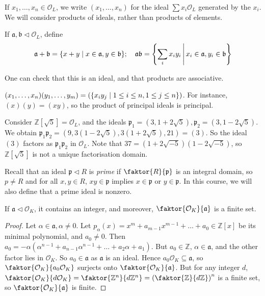 If \( x_1, \dots, x_n \in \mathcal O_L \), we write \( (x_1, \dots, x_n) \) for the ideal \( \sum x_i \mathcal O_L \) generated by the \( x_i \).
We will consider products of ideals, rather than products of elements.
\begin{definition}
    If \( \mathfrak a, \mathfrak b \triangleleft \mathcal O_L \), define
    \[ \mathfrak a + \mathfrak b = \qty{x + y \mid x \in \mathfrak a, y \in \mathfrak b};\quad \mathfrak a \mathfrak b = \qty{\sum_i x_i y_i \,\middle|\,x_i \in \mathfrak a, y_i \in \mathfrak b} \]
\end{definition}
One can check that this is an ideal, and that products are associative.
\begin{example}
    \( (x_1, \dots, x_n) (y_1, \dots, y_m) = \qty(\qty{x_i y_j \mid 1 \leq i \leq n, 1 \leq j \leq n}) \).
    For instance, \( (x)(y) = (xy) \), so the product of principal ideals is principal.
\end{example}
\begin{example}
    Consider \( \mathbb Z[\sqrt{5}] = \mathcal O_L \), and the ideals \( \mathfrak p_1 = (3, 1 + 2\sqrt{5}), \mathfrak p_2 = (3, 1-2\sqrt{5}) \).
    We obtain \( \mathfrak p_1 \mathfrak p_2 = (9, 3(1-2\sqrt{5}), 3(1+2\sqrt{5}), 21) = (3) \).
    So the ideal \( (3) \) factors as \( \mathfrak p_1 \mathfrak p_2 \) in \( \mathcal O_L \).
    Note that \( 37 = (1 + 2\sqrt{-5})(1 - 2\sqrt{-5}) \), so \( \mathbb Z[\sqrt{5}] \) is not a unique factorisation domain.
\end{example}
Recall that an ideal \( \mathfrak p \triangleleft R \) is \emph{prime} if \( \faktor{R}{\mathfrak p} \) is an integral domain, so \( p \neq R \) and for all \( x, y \in R \), \( xy \in \mathfrak p \) implies \( x \in \mathfrak p \) or \( y \in \mathfrak p \).
In this course, we will also define that a prime ideal is nonzero.
\begin{lemma}
    If \( \mathfrak a \triangleleft \mathcal O_K \), it contains an integer, and moreover, \( \faktor{\mathcal O_K}{\mathfrak a} \) is a finite set.
\end{lemma}
\begin{proof}
    Let \( \alpha \in \mathfrak a, \alpha \neq 0 \).
    Let \( p_\alpha(x) = x^m + a_{m-1} x^{m-1} + \dots + a_0 \in \mathbb Z[x] \) be its minimal polynomial, and \( a_0 \neq 0 \).
    Then \( a_0 = -\alpha(\alpha^{n-1} + a_{n-1} \alpha^{n-1} + \dots + a_2 \alpha + a_1) \).
    But \( a_0 \in \mathbb Z \), \( \alpha \in \mathfrak a \), and the other factor lies in \( \mathcal O_K \).
    So \( a_0 \in \mathfrak a \) as \( \mathfrak a \) is an ideal.
    Hence \( a_0 \mathcal O_K \subseteq \mathfrak a \), so \( \faktor{\mathcal O_K}{a_0 \mathcal O_K} \) surjects onto \( \faktor{\mathcal O_K}{\mathfrak a} \).
    But for any integer \( d \), \( \faktor{\mathcal O_K}{d\mathcal O_K} = \faktor{\mathbb Z^n}{d\mathbb Z^n} = \qty(\faktor{\mathbb Z}{d\mathbb Z})^n \) is a finite set, so \( \faktor{\mathcal O_K}{\mathfrak a} \) is finite.
\end{proof}
